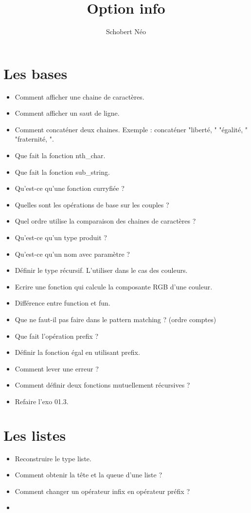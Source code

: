 \documentclass[a4paper, 11pt, hidelinks]{article}
\begin{document}
\newcommand{\grad}[1]{\vv{grad}#1}


\title{Option info}
\author{Schobert Néo}

\maketitle

\tableofcontents

\newpage 


\section{Les bases}



\begin{itemize}
    \item Comment afficher une chaine de caractères.
    \item Comment afficher un saut de ligne.
    \item Comment concaténer deux chaines. Exemple : concaténer "liberté, " "égalité, " "fraternité, ".
    \item Que fait la fonction nth\_char.
    \item Que fait la fonction sub\_string.
    \item Qu'est-ce qu'une fonction curryfiée ?
    \item Quelles sont les opérations de base sur les couples ?
    \item Quel ordre utilise la comparaison des chaines de caractères ? 
    \item Qu'est-ce qu'un type produit ? 
    \item Qu'est-ce qu'un nom avec paramètre ? 
    \item Définir le type récursif. L'utiliser dans le cas des couleurs.
    \item Ecrire une fonction qui calcule la composante RGB d'une couleur.
    \item Différence entre function et fun.
    \item Que ne faut-il pas faire dans le pattern matching ? (ordre comptes)
    \item Que fait l'opération prefix ?
    \item Définir la fonction égal en utilisant prefix.
    \item Comment lever une erreur ?
    \item Comment définir deux fonctions mutuellement récursives ?
    \item Refaire l'exo 01.3.
\end{itemize}



\section{Les listes}


\begin{itemize}
    \item Reconstruire le type liste.
    \item Comment obtenir la tête et la queue d'une liste ?
    \item Comment changer un opérateur infix en opérateur préfix ?
    \item 
\end{itemize}
\end{document}
